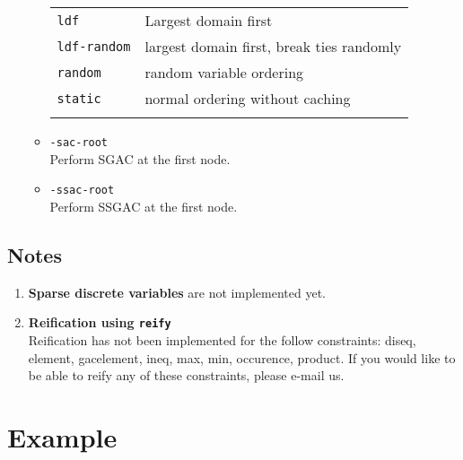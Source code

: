 \documentclass{article}
\begin{document}
\begin{small}
\begin{enumerate}
\begin{itemize}
\begin{tabular}{ll}
        \texttt{ldf} & Largest domain first\\
        \texttt{ldf-random} & largest domain first, break ties randomly\\
	\texttt{random} & random variable ordering\\
	\texttt{static} & normal ordering without caching \\
        & \\
      \end{tabular}
      \item \texttt{-sac-root}\\
	Perform SGAC at the first node. 
      \item \texttt{-ssac-root}\\
	Perform SSGAC at the first node. 
   \end{itemize}
\end{enumerate}



\subsection*{Notes}
\begin{enumerate}
 \item \textbf{Sparse discrete variables} are not implemented yet. 

  \item \textbf{Reification using \texttt{reify}} \\
    Reification has not been implemented for the follow constraints:
    diseq, element, gacelement, ineq, max, min, occurence, product. If you would
    like to be able to reify any of these constraints, please e-mail us.
\end{enumerate}



\clearpage
\section{Example}\label{sect_example}


\end{small}
\end{document}
